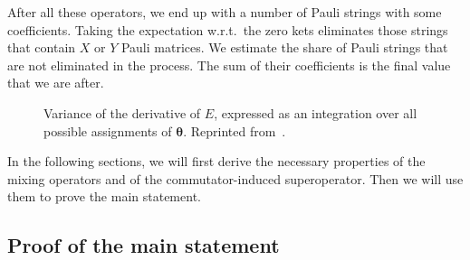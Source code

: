After all these operators, we end up with a number of Pauli strings with some coefficients. Taking the expectation w.r.t.\ the zero kets eliminates those strings that contain $X$ or $Y$ Pauli matrices. We estimate the share of Pauli strings that are not eliminated in the process. The sum of their coefficients is the final value that we are after.

\begin{figure}
    
    
    \caption{Variance of the derivative of $E$, expressed as an integration over all possible assignments of $\boldsymbol{\theta}$. Reprinted from~\cite{uvarov_barren_2021}.
    }
    \label{fig:variance_as_diagram}
\end{figure}

In the following sections, we will first derive the necessary properties of the mixing operators and of the commutator-induced superoperator. Then we will use them to prove the main statement.

\subsection{Proof of the main statement}

